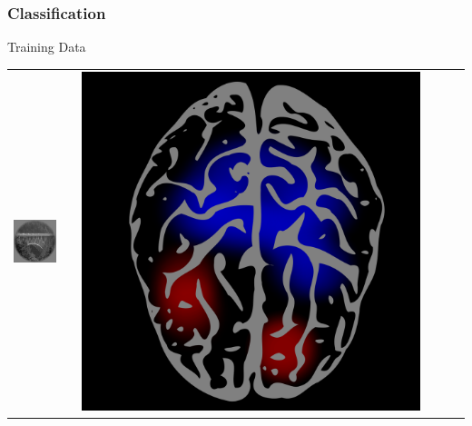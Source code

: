 \documentclass{beamer}
\begin{document}
\begin{frame}
\frametitle{Classification}
\begin{center}
Training Data
\\
\begin{tabular}{ccc||ccc}
\hline
\includegraphics[scale = .26]{img1.png} & \hspace{0.2in} & \includegraphics[scale = 0.035]{brain1.png} &

\end{tabular}
\end{center}
\end{frame}
\end{document}
